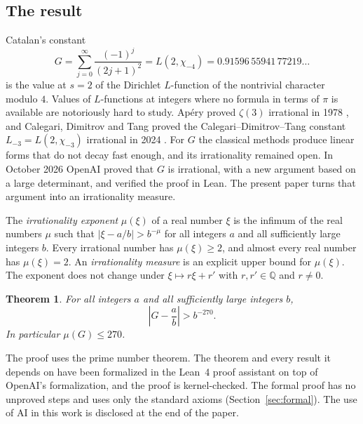 \documentclass[11pt]{amsart}
\newtheorem{theorem}{Theorem}[section]
\theoremstyle{definition}
\theoremstyle{remark}
\numberwithin{equation}{section}
\newcommand{\Q}{\mathbb Q}
\begin{document}
\subsection{The result}
Catalan's constant
\[
 G=\sum_{j=0}^\infty\frac{(-1)^j}{(2j+1)^2}=L(2,\chi_{-4})=0.91596\,55941\,77219\ldots
\]
is the value at $s=2$ of the Dirichlet $L$-function of the nontrivial character modulo $4$. Values of
$L$-functions at integers where no formula in terms of $\pi$ is available are notoriously hard to study.
Ap\'ery proved $\zeta(3)$ irrational in 1978 \cite{Apery79}, and Calegari, Dimitrov and Tang proved
the Calegari--Dimitrov--Tang constant $L_{-3}=L(2,\chi_{-3})$ irrational in 2024 \cite{CDT2024}. For $G$ the classical methods produce linear forms
that do not decay fast enough, and its irrationality remained open. In October 2026 OpenAI
\cite{OpenAI2026} proved that $G$ is irrational, with a new argument based on a large determinant, and
verified the proof in Lean. The present paper turns that argument into an irrationality measure.

The \emph{irrationality exponent} $\mu(\xi)$ of a real number $\xi$ is the infimum of the real numbers
$\mu$ such that $|\xi-a/b|>b^{-\mu}$ for all integers $a$ and all sufficiently large integers $b$. Every
irrational number has $\mu(\xi)\ge2$, and almost every real number has $\mu(\xi)=2$. An
\emph{irrationality measure} is an explicit upper bound for $\mu(\xi)$. The exponent does not change under
$\xi\mapsto r\xi+r'$ with $r,r'\in\Q$ and $r\ne0$.

\begin{theorem}\label{thm:main}
For all integers $a$ and all sufficiently large integers $b$,
\[
 \left|G-\frac ab\right|>b^{-270}.
\]
In particular $\mu(G)\le270$.
\end{theorem}

The proof uses the prime number theorem. The theorem and every result it depends on have been formalized
in the Lean~4 proof assistant on top of OpenAI's formalization, and the proof is kernel-checked. The formal proof has no unproved steps
and uses only the standard axioms (Section~\ref{sec:formal}). The use of AI in this work is disclosed at
the end of the paper.
\end{document}
